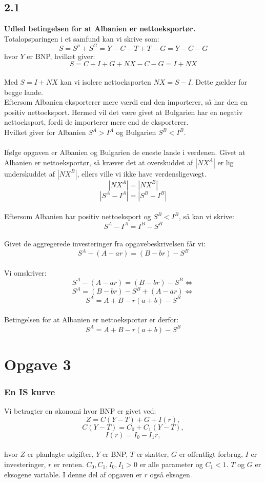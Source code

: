 \documentclass[a4paper, 12pt]{article}
\begin{document}
\subsection*{2.1}
\textbf{Udled betingelsen for at Albanien er nettoeksportør.}
\\
Totalopsparingen i et samfund kan vi skrive som:
$$S = S^{p} + S^{G} = Y - C - T + T - G = Y - C -G $$
hvor $Y$ er BNP, hvilket giver:
$$S = C + I + G +NX- C - G = I +NX$$
\\
Med $S = I + NX$ kan vi isolere nettoeksporten $NX = S - I$. Dette gælder for begge lande. 
\\
Eftersom Albanien eksporterer mere værdi end den importerer, så har den en positiv nettoeksport. Hermed vil det være givet at Bulgarien har en negativ nettoeksport, fordi de importerer mere end de eksporterer.
\\
Hvilket giver for Albanien $S^{A} > I^{A}$ og Bulgarien $S^{B} < I^{B}$.
\\\\
Ifølge opgaven er Albanien og Bulgarien de eneste lande i verdenen. Givet at Albanien er nettoeksportør, så kræver det at overskuddet af $| NX^{A} |$  er lig underskuddet af $| NX^{B} |$, ellers ville vi ikke have verdensligevægt.
$$|NX^{A}| = |NX^{B} |$$
$$|S^{A} - I^{A}| = |S^{B} - I^{B} |$$
\\
Eftersom Albanien har positiv nettoeksport og $S^{B} < I^{B}$, så kan vi skrive: 
$$S^{A} - I^{A} =  I^{B} - S^{B}$$
\\
Givet de aggregerede investeringer fra opgavebeskrivelsen får vi:
$$ S^{A} - (A - ar) = (B-br) - S^{B} $$
\\
Vi omskriver:
$$ S^{A} - (A - ar) = (B-br) - S^{B}  \Leftrightarrow$$
$$ S^{A} = (B-br) - S^{B} +  (A - ar) \Leftrightarrow $$
$$ S^{A} =  A+B -r(a+b) -S^{B} $$
\\
Betingelsen for at Albanien er nettoeksportør er derfor:
$$ S^{A} =  A+B -r(a+b) -S^{B} $$

\section*{Opgave 3}

\subsubsection*{En IS kurve}
Vi betragter en økonomi hvor BNP er givet ved:
$$Z = C(Y-T) + G + I(r),$$
$$C(Y-T) = C_{0} + C_{1}(Y-T),$$
$$I(r) = I_{0} - I_{1}r,$$
\\
hvor $Z$ er planlagte udgifter, $Y$ er BNP, $T$ er skatter, $G$ er offentligt forbrug, $I$ er investeringer, $r$ er renten. $C_{0},C_{1},I_{0},I_{1} > 0$ er alle parameter og $C_{1} < 1$. $T$ og $G$ er eksogene variable. I denne del af opgaven er $r$ også eksogen.
\end{document}
